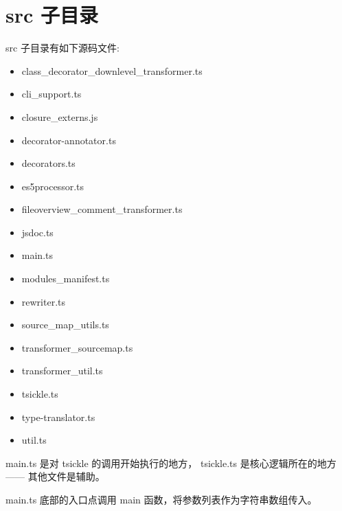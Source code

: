 \section{src 子目录}


src 子目录有如下源码文件:

\begin{itemize}
  \item class\_decorator\_downlevel\_transformer.ts
  \item cli\_support.ts
  \item closure\_externs.js
  \item decorator-annotator.ts
  \item decorators.ts
  \item es5processor.ts
  \item fileoverview\_comment\_transformer.ts
  \item jsdoc.ts
  \item main.ts
  \item modules\_manifest.ts
  \item rewriter.ts
  \item source\_map\_utils.ts
  \item transformer\_sourcemap.ts
  \item transformer\_util.ts
  \item tsickle.ts
  \item type-translator.ts
  \item util.ts
\end{itemize}


main.ts 是对 tsickle 的调用开始执行的地方，
tsickle.ts 是核心逻辑所在的地方 —— 其他文件是辅助。


main.ts 底部的入口点调用 main 函数，将参数列表作为字符串数组传入。




